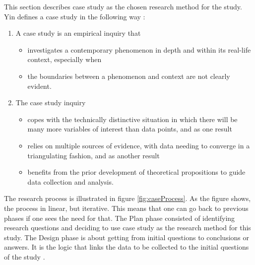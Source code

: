 This section describes case study as the chosen research method for the study. Yin defines a case study in the following way \cite{CaseStudyResearch}:

\begin{enumerate}
\item A case study is an empirical inquiry that
\begin{itemize}
\item investigates a contemporary phenomenon in depth and within its real-life context, especially when
\item the boundaries between a phenomenon and context are not clearly evident.
\end{itemize}
\item The case study inquiry
\begin{itemize}
\item copes with the technically distinctive situation in which there will be many more variables of interest than data points, and as one result
\item relies on multiple sources of evidence, with data needing to converge in a triangulating fashion, and as another result
\item benefits from the prior development of theoretical propositions to guide data collection and analysis.
\end{itemize}
\end{enumerate}

The research process is illustrated in figure \ref{fig:caseProcess}. As the figure shows, the process in linear, but iterative. This means that one can go back to previous phases if one sees the need for that. The Plan phase consisted of  identifying research questions and deciding to use case study as the research method for this study. The Design phase is about getting from initial questions to conclusions or answers. It is the logic that links the data to be collected to the initial questions of the study \cite{CaseStudyResearch}. 


